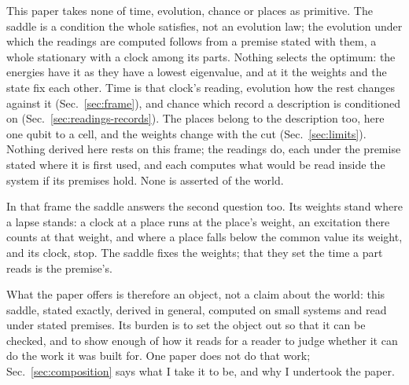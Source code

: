 \documentclass[aps,prd,reprint,superscriptaddress]{revtex4-2}
\begin{document}
This paper takes none of time, evolution, chance or places as primitive. The saddle is a condition the whole satisfies, not an evolution law; the evolution under which the readings are computed follows from a premise stated with them, a whole stationary with a clock among its parts. Nothing selects the optimum: the energies have it as they have a lowest eigenvalue, and at it the weights and the state fix each other. Time is that clock's reading, evolution how the rest changes against it (Sec.~\ref{sec:frame}), and chance which record a description is conditioned on (Sec.~\ref{sec:readings-records}). The places belong to the description too, here one qubit to a cell, and the weights change with the cut (Sec.~\ref{sec:limits}). Nothing derived here rests on this frame; the readings do, each under the premise stated where it is first used, and each computes what would be read inside the system if its premises hold. None is asserted of the world.

In that frame the saddle answers the second question too. Its weights stand where a lapse stands: a clock at a place runs at the place's weight, an excitation there counts at that weight, and where a place falls below the common value its weight, and its clock, stop. The saddle fixes the weights; that they set the time a part reads is the premise's.

What the paper offers is therefore an object, not a claim about the world: this saddle, stated exactly, derived in general, computed on small systems and read under stated premises. Its burden is to set the object out so that it can be checked, and to show enough of how it reads for a reader to judge whether it can do the work it was built for. One paper does not do that work; Sec.~\ref{sec:composition} says what I take it to be, and why I undertook the paper.
\end{document}
